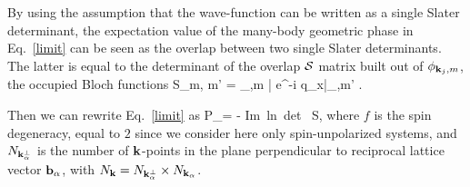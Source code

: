 By using the assumption that the wave-function can be written as a single Slater determinant,
the expectation value of the many-body geometric phase in Eq.~\eqref{limit} can be seen as the overlap between two single Slater determinants. %
The latter is equal to the determinant of the overlap $\cal S$ matrix built out of $\phi_{{\bf k}_j,m}$, the occupied Bloch functions
\be
{\cal S}_{\kk m,  m'} = \langle \phi_{\kk,m} | e^{-i \mathbf q_\alpha \hat x}|\phi_{,m'} \rangle \label{sint}.
\ee 

Then we can rewrite Eq.~\eqref{limit} as
\be
\mathbf P_\alpha = - \mbox{Im ln det } {\cal S}, \label{eq:Pipa}
\ee
where $f$ is the spin degeneracy, equal to $2$ since we consider here only spin-unpolarized systems, and $N_{{\bf k}_\alpha^\perp}$ is the number of ${\bf k}$-points in the plane perpendicular to reciprocal lattice vector ${\bf b}_\alpha$, with $N_{{\bf k}} = N_{{\bf k}_\alpha^\perp}\times N_{{\bf k}_\alpha}$.


